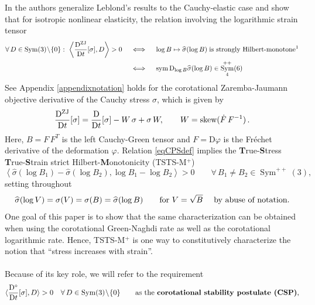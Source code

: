 \documentclass[10pt]{article}
\numberwithin{theoremCounter}{section}
\theoremstyle{plain}
\theoremstyle{definition}
\newcommand{\DD}{\mathrm{D}}
\DeclareMathOperator{\Sym}{Sym}
\DeclareMathOperator{\sym}{sym}
\DeclareMathOperator{\ZJ}{ZJ}
\def\sk{\textnormal{skew}}
\numberwithin{equation}{section}
\newcommand{\scal}[2]{\left\langle#1,#2\right\rangle}
\begin{document}
In \cite{tobedone} the authors generalize Leblond's results to the Cauchy-elastic case and show that for isotropic nonlinear elasticity, the relation involving the logarithmic strain tensor \cite{Neff_Osterbrink_Martin_Hencky13, NeffGhibaLankeit, NeffGhibaPoly}
	\begin{equation}
	\label{eqCPSdef}
	\begin{alignedat}{2}
	   \forall \,D\in\Sym(3) \! \setminus \! \{0\}:
	   ~
	   \scal{\frac{\DD^{\ZJ}}{\DD t}[\sigma]}{D} > 0
	   \quad
	   &\iff
	   \quad
	   \log B
	   \mapsto
	   \widehat\sigma(\log B)
	   \;\textrm{is strongly Hilbert-monotone\footnotemark} \\
		&\iff \quad \sym \DD_{\log B} \widehat \sigma(\log B) \in \Sym^{++}_4(6)
	\end{alignedat}
	\end{equation}
\footnotetext
{
See Appendix \ref{appendixnotation}
}
holds for the corotational Zaremba-Jaumann objective derivative of the Cauchy stress $\sigma$, which is given by
	\begin{align}
	\frac{\DD^{\ZJ}}{\DD t}[\sigma] = \frac{\DD}{\DD t}[\sigma] - W \, \sigma + \sigma \, W, \qquad W = \sk(\dot F \, F^{-1})\,.
	\end{align}
Here, $B = F \, F^T$ is the left Cauchy-Green tensor and $F = \DD \varphi$ is the Fréchet derivative of the deformation $\varphi$. Relation \eqref{eqCPSdef} implies the \textbf{T}rue-\textbf{S}tress \textbf{T}rue-\textbf{S}train strict Hilbert-\textbf{M}onotonicity (TSTS-M$^+$)
\begin{equation}
	\scal{\widehat\sigma(\log B_1)-\widehat\sigma(\log B_2)}{\log B_1-\log B_2} > 0
	\qquad
	\forall \, B_1\neq B_2\in\Sym^{++}(3),
\end{equation}
setting throughout
\begin{equation}
	\widehat\sigma(\log V)
	=
	\sigma(V)
	=
	\sigma(B)
	= \widehat \sigma(\log B) \qquad 
	\textrm{for $V = \sqrt{B}$ \quad by abuse of notation}.
\end{equation}
One goal of this paper is to show that the same characterization can be obtained when using the corotational Green-Naghdi rate as well as the corotational logarithmic rate. Hence, TSTS-M$^+$ is one way to constitutively characterize the notion that \enquote{stress increases with strain}. \\
\\
Because of its key role, we will refer to the requirement
	\begin{align}
	\langle \frac{\DD^{\circ}}{\DD t}[\sigma],D\rangle>0 \quad \forall \, D \in \Sym(3) \! \setminus \! \{0\} \qquad \textnormal{as the {\bf corotational stability postulate (CSP)},}
	\end{align}
\end{document}
